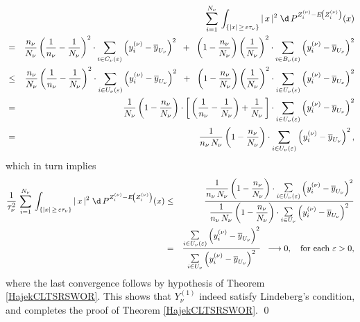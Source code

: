 \begin{eqnarray*}
&&
\sum_{i=1}^{N_{\nu}}\,
\int_{\left\{\vert x\vert \,\geq\, \varepsilon\tau_{\nu}\right\}}
\vert\,x\,\vert^{2}\;
\d\,P^{Z^{(\nu)}_{i} - E\!\left(Z^{(\nu)}_{i}\right)}(x)
\\
& = &
\dfrac{n_{\nu}}{N_{\nu}}\left(\dfrac{1}{n_{\nu}}-\dfrac{1}{N_{\nu}}\right)^{2}
\cdot\sum_{i\in C_{\nu}(\varepsilon)}\left(y^{(\nu)}_{i}-\overline{y}_{U_{\nu}}\right)^{2}
\;\; + \;\;
\left(1-\dfrac{n_{\nu}}{N_{\nu}}\right)
\left(\dfrac{1}{N_{\nu}}\right)^{2}
\cdot\sum_{i\in B_{\nu}(\varepsilon)}\left(y^{(\nu)}_{i}-\overline{y}_{U_{\nu}}\right)^{2}
\\
&\leq&
\dfrac{n_{\nu}}{N_{\nu}}\left(\dfrac{1}{n_{\nu}}-\dfrac{1}{N_{\nu}}\right)^{2}
\cdot\sum_{i\in U_{\nu}(\varepsilon)}\left(y^{(\nu)}_{i}-\overline{y}_{U_{\nu}}\right)^{2}
\;\; + \;\;
\left(1-\dfrac{n_{\nu}}{N_{\nu}}\right)
\left(\dfrac{1}{N_{\nu}}\right)^{2}
\cdot\sum_{i\in U_{\nu}(\varepsilon)}\left(y^{(\nu)}_{i}-\overline{y}_{U_{\nu}}\right)^{2}
\\
&=&
\dfrac{1}{N_{\nu}}
\left(1- \dfrac{n_{\nu}}{N_{\nu}}\right)
\cdot
\left[\,\left(\dfrac{1}{n_{\nu}} - \dfrac{1}{N_{\nu}}\right) + \dfrac{1}{N_{\nu}}\,\right]
\cdot\sum_{i\in U_{\nu}(\varepsilon)}\left(y^{(\nu)}_{i}-\overline{y}_{U_{\nu}}\right)^{2}
\\
&=&
\dfrac{1}{n_{\nu}\,N_{\nu}}
\left(1- \dfrac{n_{\nu}}{N_{\nu}}\right)
\cdot\sum_{i\in U_{\nu}(\varepsilon)}\left(y^{(\nu)}_{i}-\overline{y}_{U_{\nu}}\right)^{2},
\end{eqnarray*}
which in turn implies
\begin{eqnarray*}
\dfrac{1}{\tau^{2}_{\nu}}\,
\sum_{i=1}^{N_{\nu}}\,
\int_{\left\{\vert x\vert \,\geq\, \varepsilon\tau_{\nu}\right\}}
\vert\,x\,\vert^{2}\;
\d\,P^{Z^{(\nu)}_{i} - E\!\left(Z^{(\nu)}_{i}\right)}(x)
& \leq &
\dfrac{
\dfrac{1}{n_{\nu}\,N_{\nu}}
\left(1- \dfrac{n_{\nu}}{N_{\nu}}\right)
\cdot\underset{i\in U_{\nu}(\varepsilon)}{\textnormal{\Large$\sum$}}\left(y^{(\nu)}_{i}-\overline{y}_{U_{\nu}}\right)^{2}
}{
\dfrac{1}{n_{\nu}\,N_{\nu}}
\left(1- \dfrac{n_{\nu}}{N_{\nu}}\right)
\cdot\underset{i\in U_{\nu}}{\textnormal{\Large$\sum$}}\left(y^{(\nu)}_{i}-\overline{y}_{U_{\nu}}\right)^{2}
}
\\
& = &
\dfrac{
\underset{i\in U_{\nu}(\varepsilon)}{\textnormal{\Large$\sum$}}\left(y^{(\nu)}_{i}-\overline{y}_{U_{\nu}}\right)^{2}
}{
\underset{i\in U_{\nu}}{\textnormal{\Large$\sum$}}\left(y^{(\nu)}_{i}-\overline{y}_{U_{\nu}}\right)^{2}
}
\;\;\longrightarrow 0,
\quad
\textnormal{for each $\varepsilon > 0$},
\end{eqnarray*}
where the last convergence follows by hypothesis of Theorem \ref{HajekCLTSRSWOR}.
This shows that $Y^{(1)}_{\nu}$ indeed satisfy Lindeberg's condition, and completes the proof of
Theorem \ref{HajekCLTSRSWOR}.
\qed


